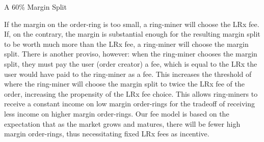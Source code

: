 \documentclass[UTF8,nofonts]{article}
\makeatletter
\newenvironment{figurehere}
 {\def\@captype{figure}}
 {}
\makeatother
\begin{document}
\begin{multicols}{2}
\begin{enumerate}
\begin{center}
\begin{figurehere}
\caption{A 60\% Margin Split}
\label{fig:marginsplit}
\end{figurehere}
\end{center}

If the margin on the order-ring is too small, a ring-miner will choose the LRx fee. If, on the contrary, the margin is substantial enough for the resulting margin split to be worth much more than the LRx fee, a ring-miner will choose the margin split. There is another proviso, however: when the ring-miner chooses the margin split, they must pay the user (order creator) a fee, which is equal to the LRx the user would have paid to the ring-miner as a fee. This increases the threshold of where the ring-miner will choose the margin split to twice the LRx fee of the order, increasing the propensity of the LRx fee choice. This allows ring-miners to receive a constant income on low margin order-rings for the tradeoff of receiving less income on higher margin order-rings. Our fee model is based on the expectation that as the market grows and matures, there will be fewer high margin order-rings, thus necessitating fixed LRx fees as incentive.



\end{enumerate}
\end{multicols}
\end{document}
